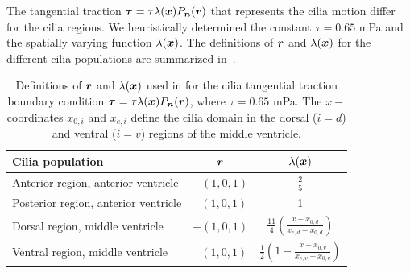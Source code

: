 \documentclass{WileyMSP-template}
\begin{document}
The tangential traction $\bm{\tau} = \tau\lambda(\bm{x}) P_{\bm{n}}(\bm{r})$ that represents the cilia
motion differ for the cilia regions. We heuristically determined the constant $\tau= 0.65$ mPa
and the spatially varying function $\lambda(\bm{x})$. The definitions of $\bm{r}$ and $\lambda(\bm{x})$
for the different cilia populations are summarized in~.
\begingroup
\setlength{\tabcolsep}{20pt}
\renewcommand{\arraystretch}{1.5}
\begin{table}[H]
    \centering
    \caption{Definitions of $\bm{r}$ and $\lambda(\bm{x})$ used in for the cilia tangential 
    traction boundary condition $\bm{\tau} = \tau\lambda(\bm{x})P_{\bm{n}}(\bm{r})$,
    where $\tau=0.65$ mPa. The $x-$coordinates $x_{0, i}$ and $x_{e, i}$ define 
    the cilia domain in the dorsal ($i=d$) and ventral ($i=v$) regions of 
    the middle ventricle.}\label{tab:r_vector_and_lambda_function}
    \begin{tabular}{lcc}
        \toprule
        Cilia population & $\bm{r}$ & $\lambda(\bm{x})$ \\
        \midrule 
        Anterior region, anterior ventricle 
        & $-(1, 0, 1)$ & $\frac{2}{5}$ \\
        Posterior region, anterior ventricle
        & $\ \ \ (1, 0, 1)$ & 1 \\
        Dorsal region, middle ventricle     
        & $-(1, 0, 1)$
        & $\frac{11}{4}\left(\frac{x-x_{0, d}}{x_{e, d} - x_{0, d}}\right)$\\
        Ventral region, middle ventricle    
        & $\ \ \ (1, 0, 1)$
        & $\frac{1}{2}\left(1 - \frac{x-x_{0, v}}{x_{e, v} - x_{0, v}}\right)$ \\
        \bottomrule
    \end{tabular}
\end{table}
\endgroup
\end{document}
